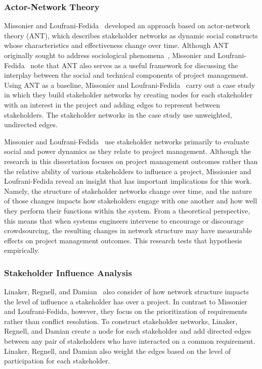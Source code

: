 \subsubsection{Actor-Network Theory}

Missonier and Loufrani-Fedida~\cite{missonier} developed an approach based on actor-network theory (ANT), which describes stakeholder networks as dynamic social constructs whose characteristics and effectiveness change over time. Although ANT originally sought to address sociological phenomena~\cite{latour}, Missonier and Loufrani-Fedida~\cite{missonier} note that ANT also serves as a useful framework for discussing the interplay between the social and technical components of project management. Using ANT as a baseline, Missonier and Loufrani-Fedida~\cite{missonier} carry out a case study in which they build stakeholder networks by creating nodes for each stakeholder with an interest in the project and adding edges to represent between stakeholders. The stakeholder networks in the case study use unweighted, undirected edges.

Missonier and Loufrani-Fedida~\cite{missonier} use stakeholder networks primarily to evaluate social and power dynamics as they relate to project management. Although the research in this dissertation focuses on project management outcomes rather than the relative ability of various stakeholders to influence a project, Missionier and Loufrani-Fedida reveal an insight that has important implications for this work. Namely, the structure of stakeholder networks change over time, and the nature of those changes impacts how stakeholders engage with one another and how well they perform their functions within the system. From a theoretical perspective, this means that when systems engineers intervene to encourage or discourage crowdsourcing, the resulting changes in network structure may have measurable effects on project management outcomes. This research tests that hypothesis empirically. 

\subsubsection{Stakeholder Influence Analysis}

Linaker, Regnell, and Damian~\cite{linaker} also consider of how network structure impacts the level of influence a stakeholder has over a project. In contrast to Missonier and Loufrani-Fedida, however, they focus on the prioritization of requirements rather than conflict resolution. To construct stakeholder networks, Linaker, Regnell, and Damian create a node for each stakeholder and add directed edges between any pair of stakeholders who have interacted on a common requirement. Linaker, Regnell, and Damian also weight the edges based on the level of participation for each stakeholder.


